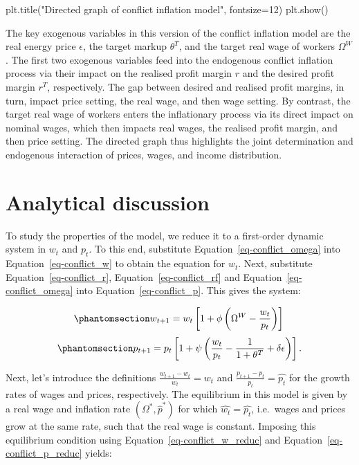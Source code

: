 \documentclass[
  letterpaper,
  DIV=11,
  numbers=noendperiod]{scrreprt}
\newenvironment{Shaded}{\begin{snugshade}}{\end{snugshade}}
\newcommand{\DecValTok}[1]{\textcolor[rgb]{0.68,0.00,0.00}{#1}}
\newcommand{\NormalTok}[1]{\textcolor[rgb]{0.00,0.23,0.31}{#1}}
\newcommand{\OperatorTok}[1]{\textcolor[rgb]{0.37,0.37,0.37}{#1}}
\newcommand{\StringTok}[1]{\textcolor[rgb]{0.13,0.47,0.30}{#1}}
\begin{document}
\begin{tcolorbox}
\begin{Shaded}
\begin{Highlighting}[]
\NormalTok{plt.title(}\StringTok{"Directed graph of conflict inflation model"}\NormalTok{, fontsize}\OperatorTok{=}\DecValTok{12}\NormalTok{)}
\NormalTok{plt.show()}
\end{Highlighting}
\end{Shaded}

\end{tcolorbox}

The key exogenous variables in this version of the conflict inflation
model are the real energy price \(\epsilon\), the target markup
\(\theta^T\), and the target real wage of workers \(\Omega^W\). The
first two exogenous variables feed into the endogenous conflict
inflation process via their impact on the realised profit margin \(r\)
and the desired profit margin \(r^T\), respectively. The gap between
desired and realised profit margins, in turn, impact price setting, the
real wage, and then wage setting. By contrast, the target real wage of
workers enters the inflationary process via its direct impact on nominal
wages, which then impacts real wages, the realised profit margin, and
then price setting. The directed graph thus highlights the joint
determination and endogenous interaction of prices, wages, and income
distribution.

\section{Analytical discussion}\label{analytical-discussion-5}

To study the properties of the model, we reduce it to a first-order
dynamic system in \(w_t\) and \(p_t\). To this end, substitute
Equation~\ref{eq-conflict_omega} into Equation~\ref{eq-conflict_w} to
obtain the equation for \(w_t\). Next, substitute
Equation~\ref{eq-conflict_r}, Equation~\ref{eq-conflict_rf} and
Equation~\ref{eq-conflict_omega} into Equation~\ref{eq-conflict_p}. This
gives the system:

\begin{equation}\phantomsection\label{eq-conflict_w_reduc}{
w_{t+1} = w_{t}\left[1+ \phi\left(\Omega^W - \frac{w_t}{p_t}\right)\right] \\
}\end{equation}
\begin{equation}\phantomsection\label{eq-conflict_p_reduc}{
p_{t+1} = p_{t} \left[1+\psi\left(\frac{w_t}{p_t} - \frac{1}{1+\theta^T} + \delta \epsilon \right) \right].
}\end{equation}

Next, let's introduce the definitions
\(\frac{w_{t+1} -w_{t}}{w_{t}} = \hat{w_t}\) and
\(\frac{p_{t+1} -p_{t}}{p_{t}} = \hat{p_t}\) for the growth rates of
wages and prices, respectively. The equilibrium in this model is given
by a real wage and inflation rate \((\Omega^*, \hat{p}^*)\) for which
\(\hat{w_t}=\hat{p_t}\), i.e.~wages and prices grow at the same rate,
such that the real wage is constant. Imposing this equilibrium condition
using Equation~\ref{eq-conflict_w_reduc} and
Equation~\ref{eq-conflict_p_reduc} yields:
\end{document}
